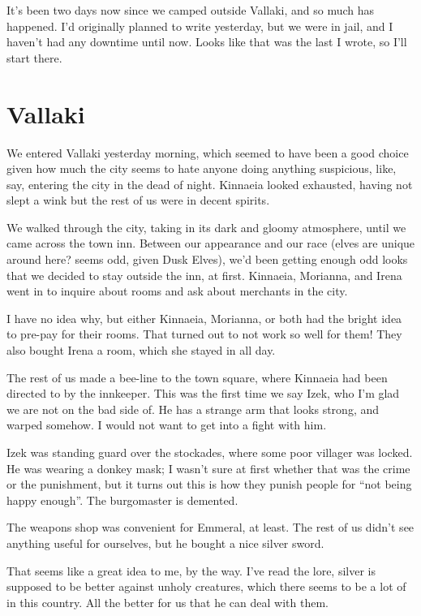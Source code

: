 
It's been two days now since we camped outside Vallaki, and so much has happened. I'd originally planned to write yesterday, but we were in jail, and I haven't had any downtime until now. Looks like that was the last I wrote, so I'll start there.

\section*{Vallaki}
We entered Vallaki yesterday morning, which seemed to have been a good choice given how much the city seems to hate anyone doing anything suspicious, like, say, entering the city in the dead of night. Kinnaeia looked exhausted, having not slept a wink but the rest of us were in decent spirits.

We walked through the city, taking in its dark and gloomy atmosphere, until we came across the town inn. Between our appearance and our race (elves are unique around here? seems odd, given Dusk Elves), we'd been getting enough odd looks that we decided to stay outside the inn, at first. Kinnaeia, Morianna, and Irena went in to inquire about rooms and ask about merchants in the city.

I have no idea why, but either Kinnaeia, Morianna, or both had the bright idea to pre-pay for their rooms. That turned out to not work so well for them! They also bought Irena a room, which she stayed in all day.

The rest of us made a bee-line to the town square, where Kinnaeia had been directed to by the innkeeper. This was the first time we say Izek, who I'm glad we are not on the bad side of. He has a strange arm that looks strong, and warped somehow. I would not want to get into a fight with him.

Izek was standing guard over the stockades, where some poor villager was locked. He was wearing a donkey mask; I wasn't sure at first whether that was the crime or the punishment, but it turns out this is how they punish people for ``not being happy enough''. The burgomaster is demented.

The weapons shop was convenient for Emmeral, at least. The rest of us didn't see anything useful for ourselves, but he bought a nice silver sword.

That seems like a great idea to me, by the way. I've read the lore, silver is supposed to be better against unholy creatures, which there seems to be a lot of in this country. All the better for us that he can deal with them.

